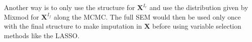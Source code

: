 \documentclass[11pt,a4paper]{report}
\begin{document}
Another way is to only use the structure for $\boldsymbol{X}^{I_r}$ and use the distribution given by Mixmod for $\boldsymbol{X}^{I_f}$ along the MCMC. The full SEM would then be used only once with the final structure to make imputation in $\boldsymbol{X}$ before using variable selection methods like the LASSO.


%			
%	
%	
%		
\end{document}
